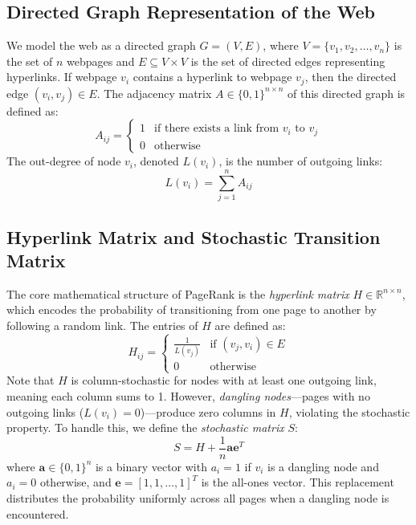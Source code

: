 \documentclass[conference]{IEEEtran}
\begin{document}
\subsection{Directed Graph Representation of the Web}
We model the web as a directed graph $G = (V, E)$, where $V = \{v_1, v_2, \ldots, v_n\}$ is the set of $n$ webpages and $E \subseteq V \times V$ is the set of directed edges representing hyperlinks. If webpage $v_i$ contains a hyperlink to webpage $v_j$, then the directed edge $(v_i, v_j) \in E$. The adjacency matrix $A \in \{0, 1\}^{n \times n}$ of this directed graph is defined as:
\begin{equation}
A_{ij} = 
\begin{cases} 
1 & \text{if there exists a link from } v_i \text{ to } v_j \\
0 & \text{otherwise}
\end{cases}
\end{equation}
The out-degree of node $v_i$, denoted $L(v_i)$, is the number of outgoing links:
\begin{equation}
L(v_i) = \sum_{j=1}^{n} A_{ij}
\end{equation}

\subsection{Hyperlink Matrix and Stochastic Transition Matrix}
The core mathematical structure of PageRank is the \textit{hyperlink matrix} $H \in \mathbb{R}^{n \times n}$, which encodes the probability of transitioning from one page to another by following a random link. The entries of $H$ are defined as:
\begin{equation}
H_{ij} = 
\begin{cases} 
\frac{1}{L(v_j)} & \text{if } (v_j, v_i) \in E \\
0 & \text{otherwise}
\end{cases}
\end{equation}
Note that $H$ is column-stochastic for nodes with at least one outgoing link, meaning each column sums to 1. However, \textit{dangling nodes}---pages with no outgoing links ($L(v_i) = 0$)---produce zero columns in $H$, violating the stochastic property. To handle this, we define the \textit{stochastic matrix} $S$:
\begin{equation}
S = H + \frac{1}{n} \mathbf{a} \mathbf{e}^T
\end{equation}
where $\mathbf{a} \in \{0, 1\}^n$ is a binary vector with $a_i = 1$ if $v_i$ is a dangling node and $a_i = 0$ otherwise, and $\mathbf{e} = [1, 1, \ldots, 1]^T$ is the all-ones vector. This replacement distributes the probability uniformly across all pages when a dangling node is encountered.
\end{document}
